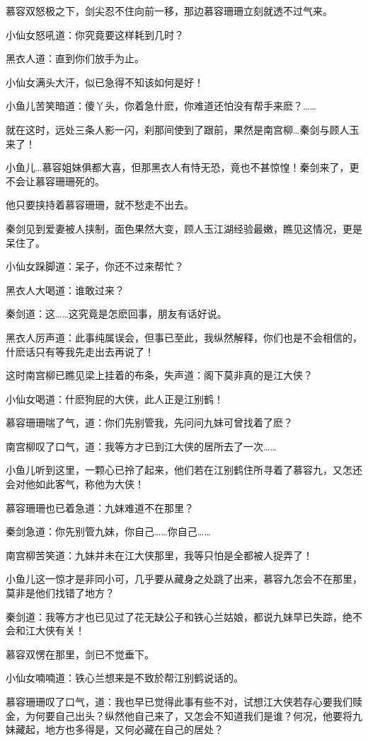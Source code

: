 \documentclass[12pt,oneside]{book}
\begin{document}
慕容双怒极之下，剑尖忍不住向前一移，那边慕容珊珊立刻就透不过气来。

小仙女怒吼道：你究竟要这样耗到几时？

黑衣人道：直到你们放手为止。

小仙女满头大汗，似已急得不知该如何是好！

小鱼儿苦笑暗道：傻丫头，你着急什麽，你难道还怕没有帮手来麽？\ldots\ldots{}

就在这时，远处三条人影一闪，刹那间使到了跟前，果然是南宫柳\ldots 秦剑与顾人玉来了！

小鱼儿\ldots 慕容姐妹俱都大喜，但那黑衣人有恃无恐，竟也不甚惊惶！秦剑来了，更不会让慕容珊珊死的。

他只要挟持着慕容珊珊，就不愁走不出去。

秦剑见到爱妻被人挟制，面色果然大变，顾人玉江湖经验最嫩，瞧见这情况，更是呆住了。

小仙女跺脚道：呆子，你还不过来帮忙？

黑衣人大喝道：谁敢过来？

秦剑道：这\ldots\ldots 这究竟是怎麽回事，朋友有话好说。

黑衣人厉声道：此事纯属误会，但事已至此，我纵然解释，你们也是不会相信的，什麽话只有等我先走出去再说了！

这时南宫柳已瞧见梁上挂着的布条，失声道：阁下莫非真的是江大侠？

小仙女喝道：什麽狗屁的大侠，此人正是江别鹤！

慕容珊珊喘了气，道：你们先别管我，先问问九妹可曾找着了麽？

南宫柳叹了口气，道：我等方才已到江大侠的居所去了一次\ldots\ldots{}

小鱼儿听到这里，一颗心已拎了起来，他们若在江别鹤住所寻着了慕容九，又怎还会对他如此客气，称他为大侠！

慕容珊珊也已着急道：九妹难道不在那里？

秦剑急道：你先别管九妹，你自己\ldots\ldots 你自己\ldots\ldots{}

南宫柳苦笑道：九妹并未在江大侠那里，我等只怕是全都被人捉弄了！

小鱼儿这一惊才是非同小可，几乎要从藏身之处跳了出来，慕容九怎会不在那里，莫非是他们找错了地方？

秦剑道：我等方才也已见过了花无缺公子和铁心兰姑娘，都说九妹早已失踪，绝不会和江大侠有关！

慕容双愣在那里，剑已不觉垂下。

小仙女喃喃道：铁心兰想来是不致於帮江别鹤说话的。

慕容珊珊叹了口气，道：我也早已觉得此事有些不对，试想江大侠若存心要我们赎金，为何要自己出头？纵然他自己来了，又怎会不知道我们是谁？何况，他要将九妹藏起，地方也多得是，又何必藏在自己的居处？
\end{document}
